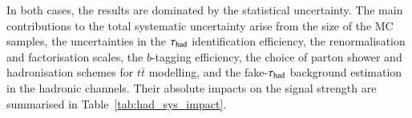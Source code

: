 In both cases, the results are dominated by the statistical uncertainty.
The main contributions to the total systematic uncertainty arise from  the size of the MC samples,
the uncertainties in the $\tau_\text{had}$ identification efficiency,
the renormalisation and factorisation scales, the $b$-tagging efficiency, the choice of parton shower and hadronisation schemes for $t\bar t$ modelling, and
the fake-$\tau_{\mathrm{had}}$ background estimation in the hadronic channels. Their absolute impacts on the signal strength are summarised in Table~\ref{tab:had_sys_impact}.
